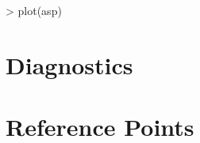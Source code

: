\documentclass[shortnames,nojss,article]{jss}
\newenvironment{mylisting}
{\begin{list}{}{\setlength{\leftmargin}{1em}}\item\scriptsize\bfseries}
{\end{list}}
\begin{document}
\begin{mylisting}\begin{center}\begin{minipage}[H]{0.95\textwidth}\begin{shaded} 
\begin{Schunk}
\begin{Sinput}
> plot(asp)
\end{Sinput}
\end{Schunk}
\end{shaded}\end{minipage}\end{center}\end{mylisting}

\begin{mylisting}\begin{center}\begin{minipage}[H]{0.95\textwidth}\begin{shaded} 
\end{shaded}\end{minipage}\end{center}\end{mylisting}

\section{Diagnostics}

\begin{mylisting}\begin{center}\begin{minipage}[H]{0.95\textwidth}\begin{shaded} 
\end{shaded}\end{minipage}\end{center}\end{mylisting}


\begin{mylisting}\begin{center}\begin{minipage}[H]{0.95\textwidth}\begin{shaded} 
\end{shaded}\end{minipage}\end{center}\end{mylisting}

\section{Reference Points}
\end{document}
